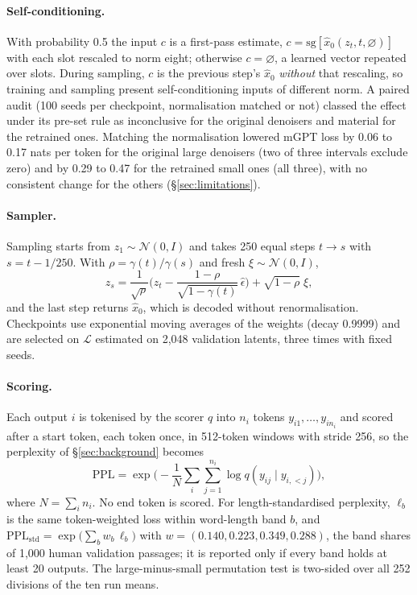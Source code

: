 \documentclass[11pt,a4paper]{article}
\begin{document}
\paragraph{Self-conditioning.} With probability 0.5 the input $c$ is a first-pass estimate, $c=\mathrm{sg}[\hat x_0(z_t,t,\varnothing)]$ with each slot rescaled to norm eight; otherwise $c=\varnothing$, a learned vector repeated over slots. During sampling, $c$ is the previous step's $\hat x_0$ \emph{without} that rescaling, so training and sampling present self-conditioning inputs of different norm. A paired audit (100 seeds per checkpoint, normalisation matched or not) classed the effect under its pre-set rule as inconclusive for the original denoisers and material for the retrained ones. Matching the normalisation lowered mGPT loss by 0.06 to 0.17 nats per token for the original large denoisers (two of three intervals exclude zero) and by 0.29 to 0.47 for the retrained small ones (all three), with no consistent change for the others (\S\ref{sec:limitations}).

\paragraph{Sampler.} Sampling starts from $z_1\sim\mathcal{N}(0,I)$ and takes 250 equal steps $t\to s$ with $s=t-1/250$. With $\rho=\gamma(t)/\gamma(s)$ and fresh $\xi\sim\mathcal{N}(0,I)$,
\begin{equation}
z_s=\frac{1}{\sqrt{\rho}}\Big(z_t-\frac{1-\rho}{\sqrt{1-\gamma(t)}}\,\hat\epsilon\Big)+\sqrt{1-\rho}\;\xi,
\end{equation}
and the last step returns $\hat x_0$, which is decoded without renormalisation. Checkpoints use exponential moving averages of the weights (decay 0.9999) and are selected on $\mathcal{L}$ estimated on 2,048 validation latents, three times with fixed seeds.

\paragraph{Scoring.} Each output $i$ is tokenised by the scorer $q$ into $n_i$ tokens $y_{i1},\dots,y_{in_i}$ and scored after a start token, each token once, in 512-token windows with stride 256, so the perplexity of \S\ref{sec:background} becomes
\begin{equation}
\mathrm{PPL}=\exp\Big(-\frac{1}{N}\sum_i\sum_{j=1}^{n_i}\log q(y_{ij}\mid y_{i,<j})\Big),
\end{equation}
where $N=\sum_i n_i$. No end token is scored. For length-standardised perplexity, $\ell_b$ is the same token-weighted loss within word-length band $b$, and $\mathrm{PPL}_{\mathrm{std}}=\exp\big(\sum_b w_b\,\ell_b\big)$ with $w=(0.140, 0.223, 0.349, 0.288)$, the band shares of 1,000 human validation passages; it is reported only if every band holds at least 20 outputs. The large-minus-small permutation test is two-sided over all 252 divisions of the ten run means.
\end{document}
